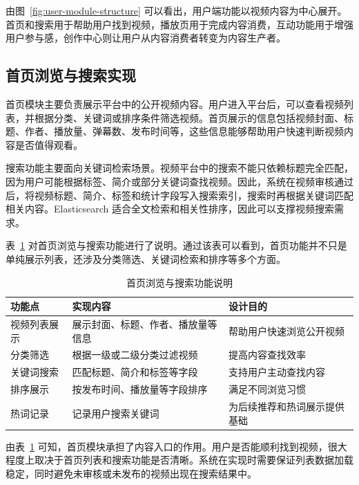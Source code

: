 由图~\ref{fig:user-module-structure} 可以看出，用户端功能以视频内容为中心展开。首页和搜索用于帮助用户找到视频，播放页用于完成内容消费，互动功能用于增强用户参与感，创作中心则让用户从内容消费者转变为内容生产者。

\subsection{首页浏览与搜索实现}
\label{subsec:home-search-implementation}

首页模块主要负责展示平台中的公开视频内容。用户进入平台后，可以查看视频列表，并根据分类、关键词或排序条件筛选视频。首页展示的信息包括视频封面、标题、作者、播放量、弹幕数、发布时间等，这些信息能够帮助用户快速判断视频内容是否值得观看。

搜索功能主要面向关键词检索场景。视频平台中的搜索不能只依赖标题完全匹配，因为用户可能根据标签、简介或部分关键词查找视频。因此，系统在视频审核通过后，将视频标题、简介、标签和统计字段写入搜索索引，搜索时再根据关键词匹配相关内容。Elasticsearch 适合全文检索和相关性排序，因此可以支撑视频搜索需求\cite{elasticsearchdocs}。

表~\ref{tab:home-search-function} 对首页浏览与搜索功能进行了说明。通过该表可以看到，首页功能并不只是单纯展示列表，还涉及分类筛选、关键词检索和排序等多个方面。

\begin{table}[htbp]
  \centering
  \caption{首页浏览与搜索功能说明}
  \label{tab:home-search-function}
  \begin{tabular}{p{}p{}p{}}
    \hline
    \textbf{功能点} & \textbf{实现内容} & \textbf{设计目的} \\
    \hline
    视频列表展示 & 展示封面、标题、作者、播放量等信息 & 帮助用户快速浏览公开视频 \\
    分类筛选 & 根据一级或二级分类过滤视频 & 提高内容查找效率 \\
    关键词搜索 & 匹配标题、简介和标签等字段 & 支持用户主动查找内容 \\
    排序展示 & 按发布时间、播放量等字段排序 & 满足不同浏览习惯 \\
    热词记录 & 记录用户搜索关键词 & 为后续推荐和热词展示提供基础 \\
    \hline
  \end{tabular}
\end{table}

由表~\ref{tab:home-search-function} 可知，首页模块承担了内容入口的作用。用户是否能顺利找到视频，很大程度上取决于首页列表和搜索功能是否清晰。系统在实现时需要保证列表数据加载稳定，同时避免未审核或未发布的视频出现在搜索结果中。

